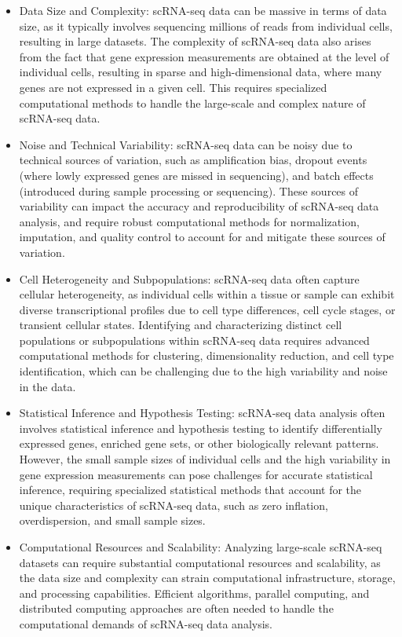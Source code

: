 \documentclass[12pt]{extarticle}
\begin{document}
\begin{itemize}
    \item Data Size and Complexity: scRNA-seq data can be massive in terms of data size, as it typically involves sequencing millions of reads from individual cells, resulting in large datasets. The complexity of scRNA-seq data also arises from the fact that gene expression measurements are obtained at the level of individual cells, resulting in sparse and high-dimensional data, where many genes are not expressed in a given cell. This requires specialized computational methods to handle the large-scale and complex nature of scRNA-seq data.

    \item Noise and Technical Variability: scRNA-seq data can be noisy due to technical sources of variation, such as amplification bias, dropout events (where lowly expressed genes are missed in sequencing), and batch effects (introduced during sample processing or sequencing). These sources of variability can impact the accuracy and reproducibility of scRNA-seq data analysis, and require robust computational methods for normalization, imputation, and quality control to account for and mitigate these sources of variation.

    \item Cell Heterogeneity and Subpopulations: scRNA-seq data often capture cellular heterogeneity, as individual cells within a tissue or sample can exhibit diverse transcriptional profiles due to cell type differences, cell cycle stages, or transient cellular states. Identifying and characterizing distinct cell populations or subpopulations within scRNA-seq data requires advanced computational methods for clustering, dimensionality reduction, and cell type identification, which can be challenging due to the high variability and noise in the data.

    \item Statistical Inference and Hypothesis Testing: scRNA-seq data analysis often involves statistical inference and hypothesis testing to identify differentially expressed genes, enriched gene sets, or other biologically relevant patterns. However, the small sample sizes of individual cells and the high variability in gene expression measurements can pose challenges for accurate statistical inference, requiring specialized statistical methods that account for the unique characteristics of scRNA-seq data, such as zero inflation, overdispersion, and small sample sizes.

    \item Computational Resources and Scalability: Analyzing large-scale scRNA-seq datasets can require substantial computational resources and scalability, as the data size and complexity can strain computational infrastructure, storage, and processing capabilities. Efficient algorithms, parallel computing, and distributed computing approaches are often needed to handle the computational demands of scRNA-seq data analysis.


\end{itemize}
\end{document}
